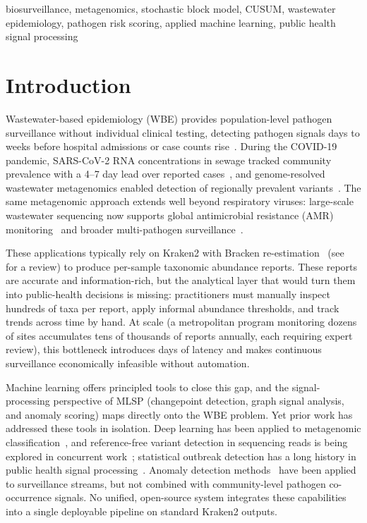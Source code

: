 \documentclass[conference]{IEEEtran}
\begin{document}
\begin{IEEEkeywords}
biosurveillance, metagenomics, stochastic block model, CUSUM,
wastewater epidemiology, pathogen risk scoring, applied machine learning,
public health signal processing
\end{IEEEkeywords}

\section{Introduction}
\label{sec:intro}

Wastewater-based epidemiology (WBE) provides population-level pathogen
surveillance without individual clinical testing, detecting pathogen
signals days to weeks before hospital admissions or case counts
rise~\cite{Bibby2021,Wu2020,Peccia2020,Medema2020}. During the COVID-19
pandemic, SARS-CoV-2 RNA concentrations in sewage tracked community
prevalence with a 4--7 day lead over reported cases~\cite{Daughton2020},
and genome-resolved wastewater metagenomics enabled detection of
regionally prevalent variants~\cite{CritsChristoph2021}. The same
metagenomic approach extends well beyond respiratory viruses: large-scale
wastewater sequencing now supports global antimicrobial resistance (AMR)
monitoring~\cite{Hendriksen2019} and broader multi-pathogen
surveillance~\cite{Quince2017}.

These applications typically rely on Kraken2 with Bracken
re-estimation~\cite{Wood2019,Lu2017} (see~\cite{Breitwieser2019} for a
review) to produce per-sample taxonomic abundance reports. These reports
are accurate and information-rich, but the analytical layer that would turn
them into public-health decisions is missing: practitioners must manually
inspect hundreds of taxa per report, apply informal abundance thresholds,
and track trends across time by hand. At scale (a metropolitan program
monitoring dozens of sites accumulates tens of thousands of reports
annually, each requiring expert review), this bottleneck introduces
days of latency and makes continuous surveillance economically infeasible
without automation.

Machine learning offers principled tools to close this gap, and the
signal-processing perspective of MLSP (changepoint detection, graph
signal analysis, and anomaly scoring) maps directly onto the WBE problem.
Yet prior work has addressed these tools in isolation. Deep
learning has been applied to metagenomic classification~\cite{Liang2020},
and reference-free variant detection in sequencing reads is being explored
in concurrent work~\cite{Azumah2026}; statistical outbreak detection has a
long history in public health signal processing~\cite{Farrington1996,Unkel2012}.
Anomaly detection methods~\cite{Chandola2009} have been applied to
surveillance streams, but not combined with community-level pathogen
co-occurrence signals. No unified, open-source system integrates these
capabilities into a single deployable pipeline on standard Kraken2 outputs.
\end{document}
